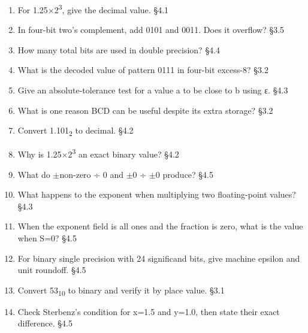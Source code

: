 \documentclass[11pt]{article}
\begin{document}
\begin{keepsection}
\begin{enumerate}
\item For 1.25\ensuremath{\times}2\textsuperscript{3}, give the decimal value. \hfill{\small\color{FAUblue}§4.1}
\item In four-bit two’s complement, add 0101 and 0011. Does it overflow? \hfill{\small\color{FAUblue}§3.5}
\item How many total bits are used in double precision? \hfill{\small\color{FAUblue}§4.4}
\item What is the decoded value of pattern 0111 in four-bit excess-8? \hfill{\small\color{FAUblue}§3.2}
\item Give an absolute-tolerance test for a value a to be close to b using ε. \hfill{\small\color{FAUblue}§4.3}
\item What is one reason BCD can be useful despite its extra storage? \hfill{\small\color{FAUblue}§3.2}
\item Convert 1.101\textsubscript{2} to decimal. \hfill{\small\color{FAUblue}§4.2}
\item Why is 1.25\ensuremath{\times}2\textsuperscript{3} an exact binary value? \hfill{\small\color{FAUblue}§4.2}
\item What do \ensuremath{\pm}non-zero ÷ 0 and \ensuremath{\pm}0 ÷ \ensuremath{\pm}0 produce? \hfill{\small\color{FAUblue}§4.5}
\item What happens to the exponent when multiplying two floating-point values? \hfill{\small\color{FAUblue}§4.3}
\item When the exponent field is all ones and the fraction is zero, what is the value when S=0? \hfill{\small\color{FAUblue}§4.5}
\item For binary single precision with 24 significand bits, give machine epsilon and unit roundoff. \hfill{\small\color{FAUblue}§4.5}
\item Convert 53\textsubscript{10} to binary and verify it by place value. \hfill{\small\color{FAUblue}§3.1}
\item Check Sterbenz’s condition for x=1.5 and y=1.0, then state their exact difference. \hfill{\small\color{FAUblue}§4.5}
\end{enumerate}

\end{keepsection}
\end{document}
